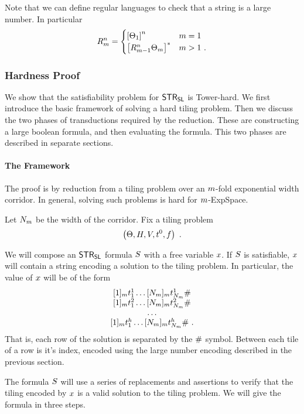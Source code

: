 Note that we can define regular languages to check that a string is a
large number. In particular
\[
    R^{n}_{m} =
    \begin{cases}
        \left[\Theta_{1}\right]^n & m = 1 \\
        \left[
            R^{n}_{m-1}
            \Theta_{m}
        \right]^\ast  & m > 1 \ .
    \end{cases}
\]

\subsubsection{Hardness Proof}

We show that the satisfiability problem for $\mathsf{STR}_{\mathsf{SL}}$ is
Tower-hard. We first introduce the basic framework of solving a hard
tiling problem. Then we discuss the two phases of transductions required
by the reduction. These are constructing a large boolean formula, and
then evaluating the formula. This two phases are described in separate
sections.

\paragraph{The Framework}

The proof is by reduction from a tiling problem over an
$m$-fold exponential width corridor. In general, solving such
problems is hard for $m$-ExpSpace.

Let $N_{m}$ be the width of the corridor. Fix a tiling
problem
\[
    \tup{\tiles, \hrel, \vrel, \inittile, \fintile} \ .
\]

We will compose an $\mathsf{STR}_{\mathsf{SL}}$ formula $S$ with a free
variable $x$. If $S$ is satisfiable, $x$ will contain a
string encoding a solution to the tiling problem. In particular, the
value of $x$ will be of the form
\[
    \begin{array}{c}
        \fullrow{1} \spacer \\
        \fullrow{2} \spacer \\
        \ldots \\
        \fullrow{\tileheight} \spacer \ .
    \end{array}
\]
That is, each row of the solution is separated by the $\#$ symbol.
Between each tile of a row is it's index, encoded using the large number
encoding described in the previous section.

The formula $S$ will use a series of replacements and assertions to verify
that the tiling encoded by $x$ is a valid solution to the tiling problem.
We will give the formula in three steps.


